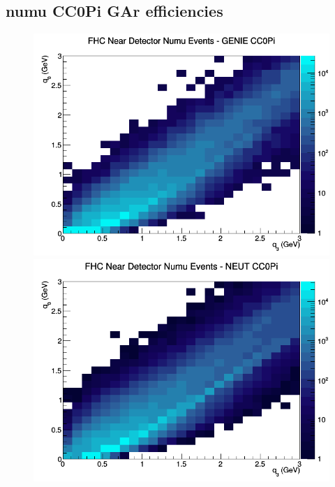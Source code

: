 \documentclass[12pt]{article}
\begin{document}
\subsection{numu CC0Pi GAr efficiencies}
\begin{figure}[h]
\includegraphics[width=\linewidth]{eff_q0_q3/GAr/CC0Pi_FHC_ND_numu_q3_q0_GENIE.png}
\endminipage
{}
\includegraphics[width=\linewidth]{eff_q0_q3/GAr/CC0Pi_FHC_ND_numu_q3_q0_NEUT.png}
\endminipage
{}

\end{figure}
\end{document}
